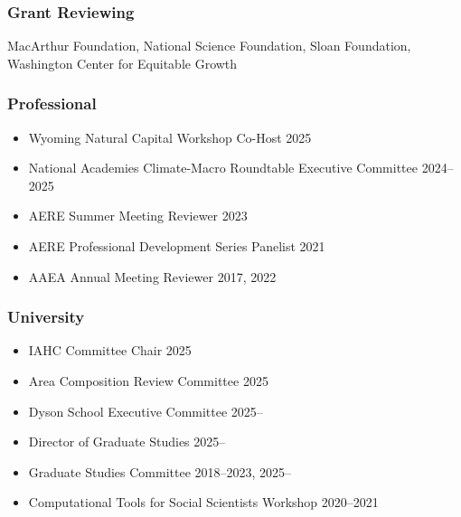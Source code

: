 \documentclass[11pt]{res} %
\begin{document}
\begin{resume}
\vspace{-.2in}

\subsubsection{Grant Reviewing} 

\vspace{-.2in}

MacArthur Foundation, National Science Foundation, Sloan Foundation, Washington Center for Equitable Growth

\vspace{-.2in}


\subsubsection{Professional}
\begin{itemize} \itemsep -1pt
	\item[] Wyoming Natural Capital Workshop Co-Host \hfill 2025
	\item[] National Academies Climate-Macro Roundtable Executive Committee  \hfill 2024--2025
	\item[] AERE Summer Meeting Reviewer \hfill 2023
	\item[]	AERE Professional Development Series Panelist \hfill 2021
	\item[] AAEA Annual Meeting Reviewer \hfill 2017, 2022
\end{itemize}


\vspace{-.2in}

\subsubsection{University}
\begin{itemize} \itemsep -1pt
	\item[] IAHC Committee Chair \hfill 2025
	\item[] Area Composition Review Committee \hfill 2025
	\item[] Dyson School Executive Committee \hfill 2025--
	\item[] Director of Graduate Studies \hfill 2025--
	\item[]	Graduate Studies Committee \hfill 2018--2023, 2025--
	\item[] Computational Tools for Social Scientists Workshop \hfill 2020--2021
\end{itemize}

\vspace{-.2in}


\end{resume}
\end{document}
